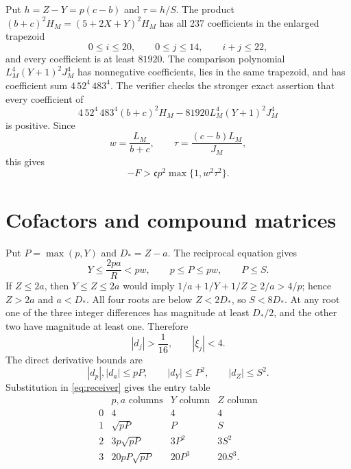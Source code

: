 Put \(h=Z-Y=p(c-b)\) and \(\tau=h/S\). The product
\((b+c)^2H_M=(5+2X+Y)^2H_M\) has all 237 coefficients in the enlarged
trapezoid
\[
 0\le i\le20,\qquad0\le j\le14,\qquad i+j\le22,
\]
and every coefficient is at least \(81920\). The comparison polynomial
\(L_M^4(Y+1)^2J_M^4\) has nonnegative coefficients, lies in the same
trapezoid, and has coefficient sum \(4\,52^4\,483^4\). The verifier checks
the stronger exact assertion that every coefficient of
\begin{equation}\label{eq:Mgap-residual}
 4\,52^4\,483^4(b+c)^2H_M
 -81920L_M^4(Y+1)^2J_M^4
\end{equation}
is positive. Since
\[
 w=\frac{L_M}{b+c},
 \qquad
 \tau=\frac{(c-b)L_M}{J_M},
\]
this gives
\begin{equation}\label{eq:M-margin}
 -F>\mathfrak c p^2\max\{1,w^2\tau^2\}.
\end{equation}

\section{Cofactors and compound matrices}

Put \(P=\max(p,Y)\) and \(D_*=Z-a\). The reciprocal equation gives
\begin{equation}\label{eq:P-bounds}
 Y\le\frac{2pa}{R}<pw,\qquad p\le P\le pw,\qquad P\le S.
\end{equation}
If \(Z\le2a\), then \(Y\le Z\le2a\) would imply
\(1/a+1/Y+1/Z\ge2/a>4/p\); hence \(Z>2a\) and \(a<D_*\). All four roots
are below \(Z<2D_*\), so \(S<8D_*\). At any root one of the three integer
differences has magnitude at least \(D_*/2\), and the other two have magnitude
at least one. Therefore
\begin{equation}\label{eq:d-xi}
 |d_j|>\frac1{16},\qquad |\xi_j|<4.
\end{equation}
The direct derivative bounds are
\[
 |d_p|,|d_a|\le pP,\qquad |d_Y|\le P^2,\qquad |d_Z|\le S^2.
\]
Substitution in \eqref{eq:receiver} gives the entry table
\begin{equation}\label{eq:entry-table}
\begin{array}{c|ccc}
 &p,a\text{ columns}&Y\text{ column}&Z\text{ column}\\ \hline
0&4&4&4\\
1&\sqrt{pP}&P&S\\
2&3p\sqrt{pP}&3P^2&3S^2\\
3&20pP\sqrt{pP}&20P^3&20S^3.
\end{array}
\end{equation}

